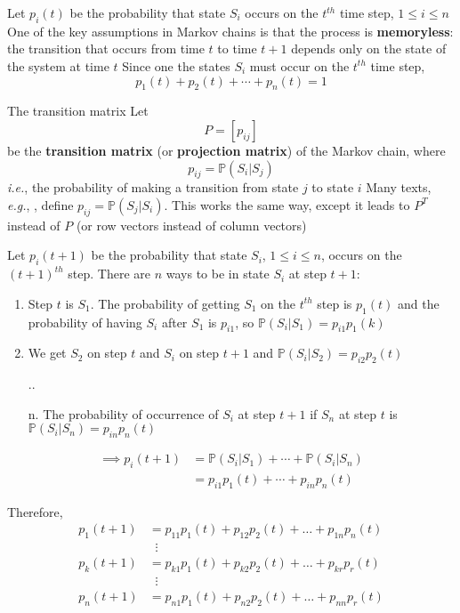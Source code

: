 \documentclass{beamer}
\def\IP{\mathbb{P}}
\def\ie{\emph{i.e.}}
\def\defword#1{\textbf{#1}}
\begin{document}
\begin{frame} 
Let $p_i(t)$ be the probability that state $S_i$ occurs on the $t^{th}$ time step, $1\leq i\leq n$
\vfill
One of the key assumptions in Markov chains is that the process is \defword{memoryless}: the transition that occurs from time $t$ to time $t+1$ depends only on the state of the system at time $t$
\vfill
Since one the states $S_i$ must occur on the $t^{th}$ time step,
\[
p_1(t)+p_2(t)+\cdots+p_n(t)=1
\]
\end{frame}

\begin{frame}{The transition matrix}
Let
\[
P=[p_{ij}]
\]
be the \defword{transition matrix} (or \defword{projection matrix}) of the Markov chain, where
\[
p_{ij} = \IP(S_i|S_j)
\]
\ie, the probability of making a transition from state $j$ to state $i$
\vfill
Many texts, \emph{e.g.}, \cite{KemenySnell1983}, define $p_{ij}=\IP(S_j|S_i)$. This works the same way, except it leads to $P^T$ instead of $P$ (or row vectors instead of column vectors)
\end{frame}

\begin{frame} 
Let $p_i(t+1)$ be the probability that state $S_i$, $1\leq i\leq n$, occurs on the $(t+1)^{th}$ step. 
There are $n$ ways to be in state $S_i$ at step $t+1$:
\begin{enumerate}
	\item Step $t$ is $S_1$. The probability of getting $S_1$ on the $t^{th}$ step is $p_1(t)$ and the probability of having $S_i$ after $S_1$ is $p_{i1}$, so $\IP(S_i|S_1)=p_{i1}p_1(k)$
	\item We get $S_2$ on step $t$ and $S_i$ on step $t+1$ and $\IP(S_i|S_2)=p_{i2}p_2(t)$
	\item[..]
	\item[n.] The probability of occurrence of $S_i$ at step $t+1$ if $S_n$ at step $t$ is $\IP(S_i|S_n)=p_{in}p_n(t)$
\end{enumerate}
\vfill
\begin{align*}
\implies p_i(t+1) &= \IP(S_i|S_1)+\cdots+\IP(S_i|S_n) \\
&= p_{i1}p_1(t)+\cdots+p_{in}p_n(t)
\end{align*}
\end{frame}

\begin{frame} 
Therefore,
\begin{align*}
p_1(t+1) &= p_{11}p_1(t)+p_{12}p_2(t)+\dots+p_{1n}p_n(t) \\
& \;\;\vdots\\
p_k(t+1) &= p_{k1}p_1(t)+p_{k2}p_2(t)+\dots+p_{kr}p_r(t) \\
& \;\;\vdots\\
p_n(t+1) &= p_{n1}p_1(t)+p_{n2}p_2(t)+\dots+p_{nn}p_r(t)
\end{align*}
\end{frame}
\end{document}
